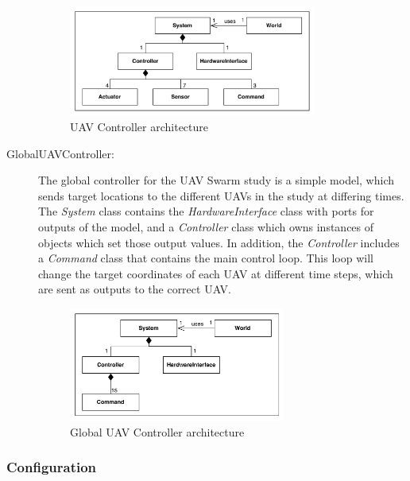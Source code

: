 \begin{description}
\begin{figure}[htbp]
\begin{center}
\includegraphics[width=0.8\textwidth]{uavswarm/uavcontarch}
\caption{UAV Controller architecture}
\label{fig:swarm-uav-cont}
\end{center}
\end{figure}

\item[GlobalUAVController:] The global controller for the UAV Swarm study is a simple model, which sends target locations to the different UAVs in the study at differing times. The \emph{System} class contains the \emph{HardwareInterface} class with ports for outputs of the model, and a \emph{Controller} class which owns instances of objects which set those output values. In addition, the \emph{Controller} includes a \emph{Command} class that contains the main control loop. This loop will change the target coordinates of each UAV at  different time steps, which are sent as outputs to the correct UAV.


\begin{figure}[htbp]
\begin{center}
\includegraphics[width=0.7\textwidth]{uavswarm/globaluavcontarch}
\caption{Global UAV Controller architecture}
\label{fig:swarm-global-cont}
\end{center}
\end{figure}
\end{description}

\subsubsection{Configuration}

